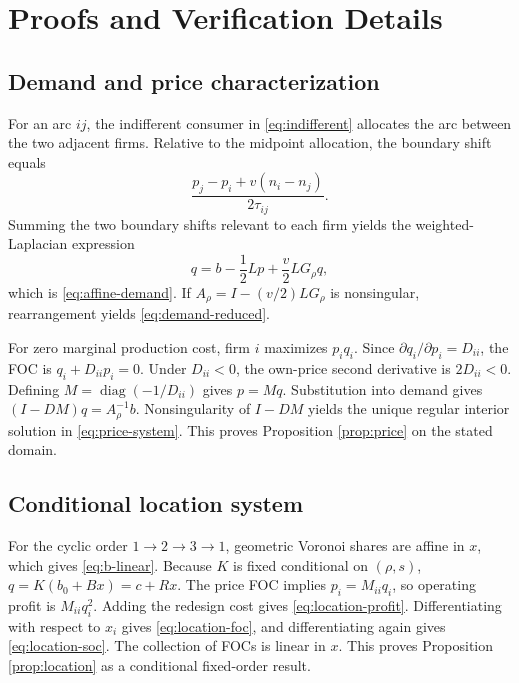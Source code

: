 \section{Proofs and Verification Details}\label{app:proofs}

\subsection{Demand and price characterization}

For an arc $ij$, the indifferent consumer in \eqref{eq:indifferent} allocates the arc between the two adjacent firms. Relative to the midpoint allocation, the boundary shift equals
\[
\frac{p_j-p_i+v(n_i-n_j)}{2\tau_{ij}}.
\]
Summing the two boundary shifts relevant to each firm yields the weighted-Laplacian expression
\[
q=b-\frac12Lp+\frac v2LG_\rho q,
\]
which is \eqref{eq:affine-demand}. If $A_\rho=I-(v/2)LG_\rho$ is nonsingular, rearrangement yields \eqref{eq:demand-reduced}.

For zero marginal production cost, firm $i$ maximizes $p_iq_i$. Since $\partial q_i/\partial p_i=D_{ii}$, the FOC is $q_i+D_{ii}p_i=0$. Under $D_{ii}<0$, the own-price second derivative is $2D_{ii}<0$. Defining $M=\operatorname{diag}(-1/D_{ii})$ gives $p=Mq$. Substitution into demand gives $(I-DM)q=A_\rho^{-1}b$. Nonsingularity of $I-DM$ yields the unique regular interior solution in \eqref{eq:price-system}. This proves Proposition \ref{prop:price} on the stated domain.

\subsection{Conditional location system}

For the cyclic order $1\to2\to3\to1$, geometric Voronoi shares are affine in $x$, which gives \eqref{eq:b-linear}. Because $K$ is fixed conditional on $(\rho,s)$, $q=K(b_0+Bx)=c+Rx$. The price FOC implies $p_i=M_{ii}q_i$, so operating profit is $M_{ii}q_i^2$. Adding the redesign cost gives \eqref{eq:location-profit}. Differentiating with respect to $x_i$ gives \eqref{eq:location-foc}, and differentiating again gives \eqref{eq:location-soc}. The collection of FOCs is linear in $x$. This proves Proposition \ref{prop:location} as a conditional fixed-order result.

